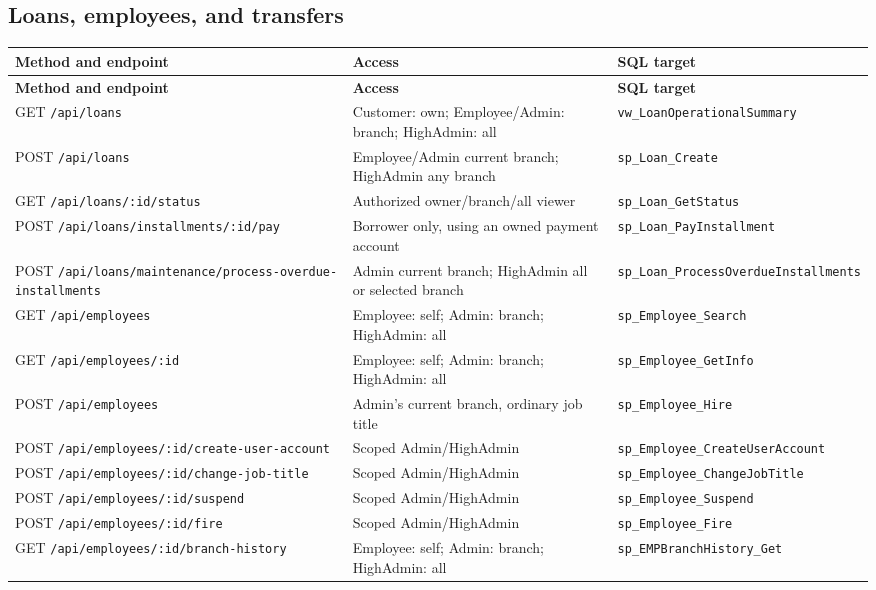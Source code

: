 \documentclass[11pt,a4paper,oneside]{report}
\begin{document}
{\subsection{Loans, employees, and transfers}
\begin{longtable}{L{0.40\textwidth}L{0.27\textwidth}L{0.24\textwidth}}
\toprule\textbf{Method and endpoint} & \textbf{Access} & \textbf{SQL target}\\\midrule\endfirsthead
\toprule\textbf{Method and endpoint} & \textbf{Access} & \textbf{SQL target}\\\midrule\endhead
GET \nolinkurl{/api/loans} & Customer: own; Employee/Admin: branch; HighAdmin: all & \nolinkurl{vw_LoanOperationalSummary}\\
POST \nolinkurl{/api/loans} & Employee/Admin current branch; HighAdmin any branch & \nolinkurl{sp_Loan_Create}\\
GET \nolinkurl{/api/loans/:id/status} & Authorized owner/branch/all viewer & \nolinkurl{sp_Loan_GetStatus}\\
POST \nolinkurl{/api/loans/installments/:id/pay} & Borrower only, using an owned payment account & \nolinkurl{sp_Loan_PayInstallment}\\
POST \nolinkurl{/api/loans/maintenance/process-overdue-installments} & Admin current branch; HighAdmin all or selected branch & \nolinkurl{sp_Loan_ProcessOverdueInstallments}\\
GET \nolinkurl{/api/employees} & Employee: self; Admin: branch; HighAdmin: all & \nolinkurl{sp_Employee_Search}\\
GET \nolinkurl{/api/employees/:id} & Employee: self; Admin: branch; HighAdmin: all & \nolinkurl{sp_Employee_GetInfo}\\
POST \nolinkurl{/api/employees} & Admin's current branch, ordinary job title & \nolinkurl{sp_Employee_Hire}\\
POST \nolinkurl{/api/employees/:id/create-user-account} & Scoped Admin/HighAdmin & \nolinkurl{sp_Employee_CreateUserAccount}\\
POST \nolinkurl{/api/employees/:id/change-job-title} & Scoped Admin/HighAdmin & \nolinkurl{sp_Employee_ChangeJobTitle}\\
POST \nolinkurl{/api/employees/:id/suspend} & Scoped Admin/HighAdmin & \nolinkurl{sp_Employee_Suspend}\\
POST \nolinkurl{/api/employees/:id/fire} & Scoped Admin/HighAdmin & \nolinkurl{sp_Employee_Fire}\\
GET \nolinkurl{/api/employees/:id/branch-history} & Employee: self; Admin: branch; HighAdmin: all & \nolinkurl{sp_EMPBranchHistory_Get}\\

\end{longtable}}
\end{document}
